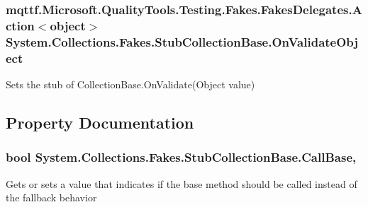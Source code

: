 \hypertarget{class_system_1_1_collections_1_1_fakes_1_1_stub_collection_base_a68579c028d819c666bb8f2171d55280d}{
\subsubsection[{On\-Validate\-Object}]{\setlength{\rightskip}{0pt plus 5cm}mqttf.\-Microsoft.\-Quality\-Tools.\-Testing.\-Fakes.\-Fakes\-Delegates.\-Action$<$object$>$ System.\-Collections.\-Fakes.\-Stub\-Collection\-Base.\-On\-Validate\-Object}}\label{class_system_1_1_collections_1_1_fakes_1_1_stub_collection_base_a68579c028d819c666bb8f2171d55280d}


Sets the stub of Collection\-Base.\-On\-Validate(\-Object value)



\subsection{Property Documentation}
\hypertarget{class_system_1_1_collections_1_1_fakes_1_1_stub_collection_base_a2e297fb093e55ecb488cfcb8d514bab6}{
\subsubsection[{Call\-Base}]{\setlength{\rightskip}{0pt plus 5cm}bool System.\-Collections.\-Fakes.\-Stub\-Collection\-Base.\-Call\-Base\hspace{0.3cm}{\ttfamily [get]}, {\ttfamily [set]}}}\label{class_system_1_1_collections_1_1_fakes_1_1_stub_collection_base_a2e297fb093e55ecb488cfcb8d514bab6}


Gets or sets a value that indicates if the base method should be called instead of the fallback behavior

